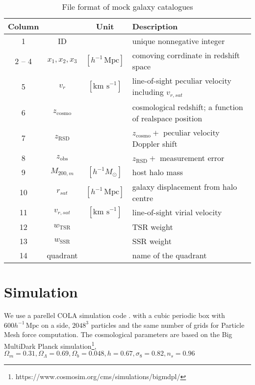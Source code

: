 \documentclass[a4paper,11pt]{article}
\begin{document}
\begin{table}
\begin{center}
  \begin{tabular}[b]{cccl}
    \hline
    Column &  & Unit & Description\\
    \hline
    1      & ID            & & unique nonnegative integer\\
    2 -- 4 & $x_1,x_2, x_3$ & $[h^{-1} \,\mathrm{Mpc}]$ &
             comoving corrdinate in redshift space\\
    5      & $v_r$ & $[\textrm{km s}^{-1}]$ & line-of-sight peculiar velocity
             including $v_{r,sat}$\\
    6      & $z_\mathrm{cosmo}$ & &
             cosmological redshift; a function of realspace position\\
    7      & $z_\mathrm{RSD}$ & & $z_\mathrm{cosmo} + $
             peculiar velocity Doppler shift\\
    8      & $z_\mathrm{obs}$ & & $z_\mathrm{RSD} + $ measurement error\\
    9      & $M_{200,m}$ & $[h^{-1} M_\odot]$ & host halo mass\\
    10     & $r_{sat}$   & $[h^{-1} \,\mathrm{Mpc}]$ &
             galaxy displacement from halo centre\\
    11     & $v_{r, sat}$ & $[\textrm{km s}^{-1}]$ &
             line-of-sight virial velocity\\
    12     & $w_\mathrm{TSR}$ & & TSR weight\\
    13     & $w_\mathrm{SSR}$ & & SSR weight\\
    14     & quadrant & & name of the quadrant\\
    \hline
  \end{tabular}
  \caption{File format of mock galaxy catalogues}
  \label{table:file-format}
\end{center}
\end{table}

\section{Simulation}

We use a parellel COLA simulation code \citep{2016MNRAS.459.2118K}.
with a cubic periodic box with $600h^{-1} \,\mathrm{Mpc}$ on a side,
$2048^3$ particles and the same number of grids for Particle Mesh
force computation. The cosmological parameters are based on the Big
MultiDark Planck
simulation\footnote{https://www.cosmosim.org/cms/simulations/bigmdpl/},
$\Omega_m = 0.31, \Omega_\Lambda = 0.69, \Omega_b = 0.048, h = 0.67,
\sigma_8 = 0.82, n_s = 0.96$
\end{document}
